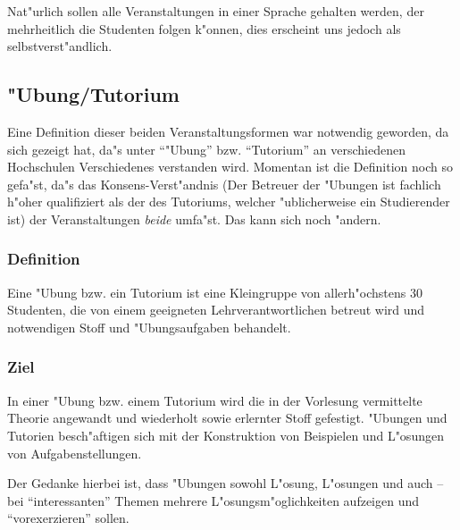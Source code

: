 \begin{kcmt}\begin{komacmt}
Nat"urlich sollen alle Veranstaltungen in einer Sprache gehalten werden, der mehrheitlich
die Studenten folgen k"onnen, dies erscheint uns jedoch als selbstverst"andlich.
\end{komacmt}\end{kcmt}



\subsection{"Ubung/Tutorium}

\begin{kcmt}\begin{komacmt}
	Eine Definition dieser beiden Veranstaltungsformen war notwendig geworden, da sich
	gezeigt hat, da"s unter "`"Ubung"' bzw. "`Tutorium"' an verschiedenen Hochschulen
	Verschiedenes verstanden wird. Momentan ist die Definition noch so gefa"st, da"s
	das Konsens-Verst"andnis (Der Betreuer der "Ubungen ist fachlich h"oher qualifiziert
	als der des Tutoriums, welcher "ublicherweise ein Studierender ist) der Veranstaltungen
	\emph{beide} umfa"st. Das kann sich noch "andern.
\end{komacmt}\end{kcmt}

\subsubsection{Definition} 

	Eine "Ubung bzw. ein Tutorium ist eine Kleingruppe von allerh"ochstens 30 Studenten, die von einem geeigneten 
	Lehrverantwortlichen betreut wird und notwendigen Stoff und "Ubungsaufgaben behandelt.

\subsubsection{Ziel} 

	In einer "Ubung bzw. einem Tutorium wird die in der Vorlesung vermittelte Theorie angewandt und wiederholt
	sowie erlernter Stoff gefestigt. "Ubungen und Tutorien besch"aftigen sich mit der Konstruktion von Beispielen 
	und L"osungen von Aufgabenstellungen.

\begin{kcmt}\begin{komacmt}
Der Gedanke hierbei ist, dass "Ubungen sowohl L"osung, L"osungen und auch -- bei "`interessanten"'
Themen mehrere L"osungsm"oglichkeiten aufzeigen und "`vorexerzieren"' sollen.
\end{komacmt}\end{kcmt}

